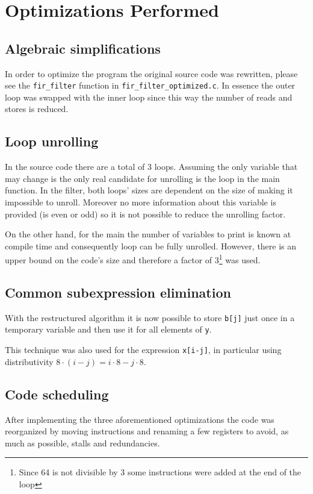 \section{Optimizations Performed}


\subsection{Algebraic simplifications}

In order to optimize the program the original source code was rewritten, please see the \texttt{fir\_filter} function in \texttt{fir\_filter\_optimized.c}. In essence the outer loop was swapped with the inner loop since this way the number of reads and stores is reduced. 

\subsection{Loop unrolling}

In the source code there are a total of 3 loops. Assuming the only variable that may change is \tap the only real candidate for unrolling is the loop in the main function. In the filter, both loops' sizes are dependent on the size of \tap making it impossible to unroll. Moreover no more information about this variable is provided (\eg \tap is even or odd) so it is not possible to reduce the unrolling factor.

On the other hand, for the main the number of variables to print is known at compile time and consequently loop can be fully unrolled. However, there is an upper bound on the code's size and therefore a factor of 3\footnote{Since 64 is not divisible by 3 some instructions were added at the end of the loop} was used.

\subsection{Common subexpression elimination}
With the restructured algorithm it is now possible to store \texttt{b[j]} just once in a temporary variable and then use it for all elements of \texttt{y}.

This technique was also used for the expression \texttt{x[i-j]}, in particular using distributivity $8 \cdot (i-j) = i\cdot8 - j\cdot8$. 

\subsection{Code scheduling}
After implementing the three aforementioned optimizations the code was reorganized by moving instructions and renaming a few registers to avoid, as much as possible, stalls and redundancies.


